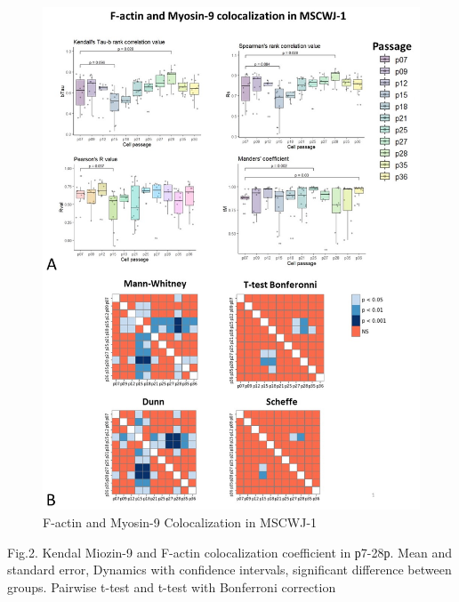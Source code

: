 \documentclass[english,authoryear]{elsarticle}
\begin{document}
\begin{figure}[hbt!]
\centering
\includegraphics[width=0.9\linewidth]{fig_m9-actin-col.jpg}
\caption{F-actin and Myosin-9 Colocalization in MSCWJ-1}
\label{m9-actin-col}
\end{figure}


Fig.2. Kendal Miozin-9 and F-actin colocalization coefficient in р7-28р. Mean and standard error, Dynamics with confidence intervals, significant difference between groups. Pairwise t-test and t-test with Bonferroni correction
\end{document}
